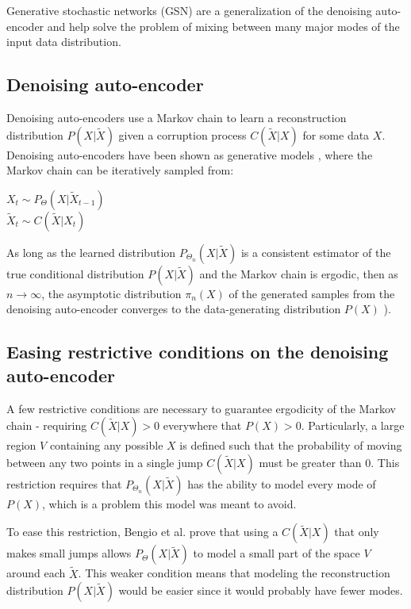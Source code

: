 Generative stochastic networks (GSN) are a generalization of the denoising auto-encoder and help solve the problem of mixing between many major modes of the input data distribution.

\subsection{Denoising auto-encoder}
Denoising auto-encoders use a Markov chain to learn a reconstruction distribution \(P(X|\widetilde{X})\) given a corruption process \(C(\widetilde{X}|X)\) for some data \(X\). Denoising auto-encoders have been shown as generative models \cite{bengio13a}, where the Markov chain can be iteratively sampled from:

 \(X_t \sim P_\Theta(X|\widetilde{X}_{t-1})\)\\
 \(\widetilde{X}_t \sim C(\widetilde{X}|X_t)\)

As long as the learned distribution \(P_{\Theta_n}(X|\widetilde{X})\) is a consistent estimator of the true conditional distribution \(P(X|\widetilde{X})\) and the Markov chain is ergodic, then as \(n \rightarrow \infty\), the asymptotic distribution \(\pi_n(X)\) of the generated samples from the denoising auto-encoder converges to the data-generating distribution \(P(X)\) \cite{bengio13a}). 


\subsection{Easing restrictive conditions on the denoising auto-encoder}

A few restrictive conditions are necessary to guarantee ergodicity of the Markov chain - requiring \(C(\widetilde{X}|X) > 0\) everywhere that \(P(X) > 0\). Particularly, a large region \(V\) containing any possible \(X\) is defined such that the probability of moving between any two points in a single jump \(C(\widetilde{X}|X)\) must be greater than 0. This restriction requires that \(P_{\Theta_n}(X|\widetilde{X})\) has the ability to model every mode of \(P(X)\), which is a problem this model was meant to avoid.

To ease this restriction, Bengio et al. \cite{gsn} prove that using a \(C(\widetilde{X}|X)\) that only makes small jumps allows \(P_{\Theta}(X|\widetilde{X})\) to model a small part of the space \(V\) around each \(\widetilde{X}\). This weaker condition means that modeling the reconstruction distribution \(P(X|\widetilde{X})\) would be easier since it would probably have fewer modes. 

